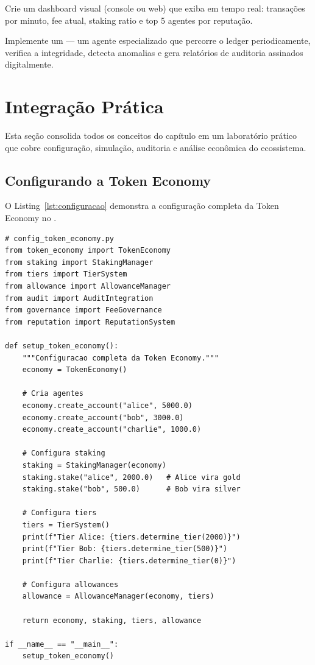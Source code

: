 \begin{exercicio}
Crie um dashboard visual (console ou web) que exiba em tempo
real: transações por minuto, fee atual, staking ratio e top 5
agentes por reputação.
\end{exercicio}

\begin{exercicio}
Implemente um  — um agente
especializado que percorre o ledger periodicamente, verifica
a integridade, detecta anomalias e gera relatórios de auditoria
assinados digitalmente.
\end{exercicio}

\section{Integração Prática}
\label{sec:integracao-pratica}

Esta seção consolida todos os conceitos do capítulo em um
laboratório prático que cobre configuração, simulação, auditoria
e análise econômica do ecossistema.

\subsection{Configurando a Token Economy}

O Listing~\ref{lst:configuracao} demonstra a configuração
completa da Token Economy no \opencodeeco{}.

\begin{lstlisting}[caption={Configuracao completa da Token Economy},
                  label={lst:configuracao}]
# config_token_economy.py
from token_economy import TokenEconomy
from staking import StakingManager
from tiers import TierSystem
from allowance import AllowanceManager
from audit import AuditIntegration
from governance import FeeGovernance
from reputation import ReputationSystem

def setup_token_economy():
    """Configuracao completa da Token Economy."""
    economy = TokenEconomy()

    # Cria agentes
    economy.create_account("alice", 5000.0)
    economy.create_account("bob", 3000.0)
    economy.create_account("charlie", 1000.0)

    # Configura staking
    staking = StakingManager(economy)
    staking.stake("alice", 2000.0)   # Alice vira gold
    staking.stake("bob", 500.0)      # Bob vira silver

    # Configura tiers
    tiers = TierSystem()
    print(f"Tier Alice: {tiers.determine_tier(2000)}")
    print(f"Tier Bob: {tiers.determine_tier(500)}")
    print(f"Tier Charlie: {tiers.determine_tier(0)}")

    # Configura allowances
    allowance = AllowanceManager(economy, tiers)

    return economy, staking, tiers, allowance

if __name__ == "__main__":
    setup_token_economy()
\end{lstlisting}

